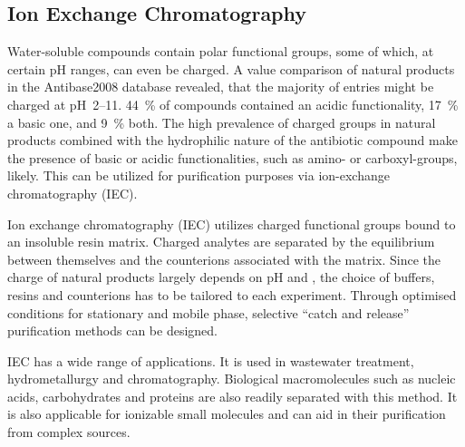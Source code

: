 

\subsection{Ion Exchange Chromatography} %
\label{sub:results_ion_exchange_chromatography}

Water-soluble compounds contain polar functional groups, some of which, at certain pH ranges, can even be charged.
A \pka value comparison of natural products in the Antibase2008 database revealed, that the majority of entries might be charged at pH~2--11.\autocite{Mansson2010}
44~\% of compounds contained an acidic functionality, 17~\% a basic one, and 9~\% both.
The high prevalence of charged groups in natural products combined with the
hydrophilic nature of the antibiotic compound make the presence of basic or
acidic functionalities, such as amino- or carboxyl-groups, likely.
This can be utilized for purification purposes via ion-exchange chromatography (IEC).

Ion exchange chromatography (IEC) utilizes charged functional groups bound to an insoluble resin matrix.\autocite{Dragull2012}
Charged analytes are separated by the equilibrium between themselves and the counterions associated with the matrix.
Since the charge of natural products largely depends on pH and \pka, the choice of buffers, resins and counterions has
to be tailored to each experiment.
Through optimised conditions for stationary and mobile phase, selective ``catch and release'' purification methods can be designed.

IEC has a wide range of applications. It is used in wastewater treatment, hydrometallurgy and chromatography.\autocite{Alexandratos2009}
Biological macromolecules such as nucleic acids, carbohydrates and proteins are also readily separated with this method.\autocite{Dragull2012,Lee1996,Kenney1992}
It is also applicable for ionizable small molecules and can aid in their purification from complex sources.\autocite{Dragull2012,Hoffmann2009a,Katavic2007}


